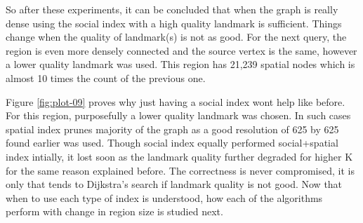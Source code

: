 So after these experiments, it can be concluded that when the graph is really dense using the social index with a high quality landmark is sufficient. Things change when the quality of landmark(s) is not as good. For the next query, the region is even more densely connected and the source vertex is the same, however a lower quality landmark was used. This region has 21,239 spatial nodes which is almost 10 times the count of the previous one.

Figure \ref{fig:plot-09} proves why just having a social index wont help like before. For this region, purposefully a lower quality landmark was chosen. In such cases spatial index prunes majority of the graph as a good resolution of 625 by 625 found earlier was used. Though social index equally performed social+spatial index intially, it lost soon as the landmark quality further degraded for higher K for the same reason explained before. The correctness is never compromised, it is only that {\rrp} tends to Dijkstra's search if landmark quality is not good. Now that when to use each type of index is understood, how each of the algorithms perform with change in region size is studied next.

